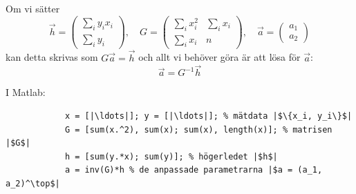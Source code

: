 \documentclass[9pt]{beamer}
\begin{document}
    \begin{frame}[fragile]
        Om vi sätter
        \begin{equation*}
            \vec h =
            \begin{pmatrix}
                \sum_i y_ix_i \\
                \sum_i y_i
            \end{pmatrix},\quad
            G =
            \begin{pmatrix}
                \sum_i x_i^2 & \sum_ix_i \\
                \sum_i x_i & n
            \end{pmatrix},\quad
            \vec a =
            \begin{pmatrix}
                a_1 \\
                a_2
            \end{pmatrix}
        \end{equation*}
        kan detta skrivas som $G\vec a = \vec h$ och allt vi behöver göra är att lösa för $\vec a$:
        \begin{equation*}
            \vec a = G^{-1}\vec h
        \end{equation*}

        I Matlab:
        \begin{verbatim}
            x = [|\ldots|]; y = [|\ldots|]; % mätdata |$\{x_i, y_i\}$|
            G = [sum(x.^2), sum(x); sum(x), length(x)]; % matrisen |$G$|
            h = [sum(y.*x); sum(y)]; % högerledet |$h$|
            a = inv(G)*h % de anpassade parametrarna |$a = (a_1, a_2)^\top$|
        \end{verbatim}


    \end{frame}
\end{document}
